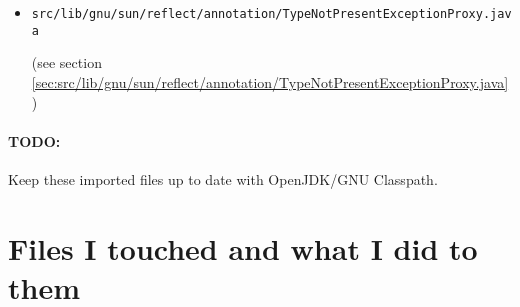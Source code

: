 \documentclass[a4paper, 10pt, titlepage]{scrartcl} %
\begin{document}
\begin{itemize}
 \item \begin{scriptsize}\verb|src|\hspace{0.0pt}\verb|/|\hspace{0.0pt}\verb|lib|\hspace{0.0pt}\verb|/|\hspace{0.0pt}\verb|gnu|\hspace{0.0pt}\verb|/|\hspace{0.0pt}\verb|sun|\hspace{0.0pt}\verb|/|\hspace{0.0pt}\verb|reflect|\hspace{0.0pt}\verb|/|\hspace{0.0pt}\verb|annotation|\hspace{0.0pt}\verb|/|\hspace{0.0pt}\verb|TypeNotPresentExceptionProxy|\hspace{0.0pt}\verb|.|\hspace{0.0pt}\verb|java|\end{scriptsize} (see section \ref{sec:src/lib/gnu/sun/reflect/annotation/TypeNotPresentExceptionProxy.java})
\end{itemize}

\paragraph{TODO:}
\label{par:TODO/keep-imported-files-up-to-date}Keep these imported files up to date with OpenJDK/GNU Classpath.

\section{Files I touched and what I did to them}
\label{sec:touched-files}
\end{document}
